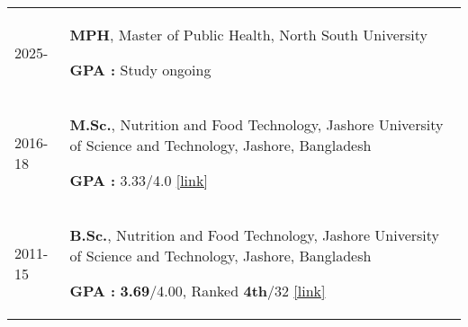 


\begin{longtable}[l]{@{}p{} p{}}

2025- &\textbf{MPH}, Master of Public Health, North South University\par
\textbf{GPA :} Study ongoing\\

2016-18 & \textbf{M.Sc.}, Nutrition and Food Technology, Jashore University of Science and Technology, Jashore, Bangladesh\par
\textbf{GPA :} 3.33/4.0 \href{https://1drv.ms/b/c/919fe16e04062443/EUMkBgRu4Z8ggJGKYAAAAAABuziKV7ZHZAA2LLVViffwrw?e=uFCn5c}{[link]} \\

2011-15 & \textbf{B.Sc.}, Nutrition and Food Technology, Jashore University of Science and Technology, Jashore, Bangladesh\par       \textbf{GPA :} \textbf{3.69}/4.00, Ranked \textbf{4th}/32 \href{https://1drv.ms/b/c/919fe16e04062443/EUMkBgRu4Z8ggJGLYAAAAAABi_cx8swChUY52w3HJ3UUKA?e=poyN2l}{[link]}
\end{longtable}
